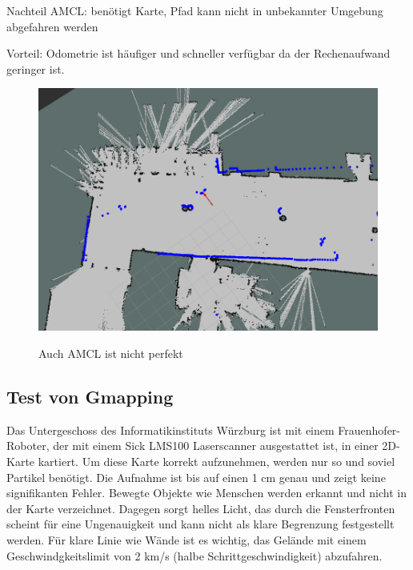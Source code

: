 \documentclass[11pt,a4paper]{article}
\begin{document}
{Nachteil AMCL: benötigt Karte, Pfad kann nicht in unbekannter Umgebung abgefahren werden

Vorteil: Odometrie ist h\"aufiger und schneller verf\"ugbar da der Rechenaufwand geringer ist. 

\begin{figure}[h]
	\centering
	{\includegraphics[width=\linewidth]{pictures/amcl_fail.png}}
	\caption{ Auch AMCL ist nicht perfekt }
\end{figure}




\subsection{Test von Gmapping}
{
	Das Untergeschoss des Informatikinstituts W\"urzburg ist mit einem Frauenhofer-Roboter, der mit einem Sick LMS100 Laserscanner ausgestattet ist, in einer 2D-Karte kartiert.  Um diese Karte korrekt aufzunehmen, werden nur so und soviel Partikel ben\"otigt. Die Aufnahme ist bis auf einen 1 cm genau und zeigt keine signifikanten Fehler. Bewegte Objekte wie Menschen werden erkannt und nicht in der Karte verzeichnet. Dagegen sorgt helles Licht, das durch die Fensterfronten scheint f\"ur eine Ungenauigkeit und kann nicht als klare Begrenzung festgestellt werden. F\"ur klare Linie wie W\"ande ist es wichtig, das Gel\"ande mit einem Geschwindgkeitslimit von 2 km/s (halbe Schrittgeschwindigkeit) abzufahren. 
	
}}
\end{document}
